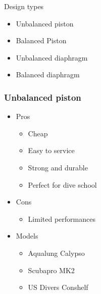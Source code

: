 \documentclass[aspectratio=1610,english,12pt]{beamer}
\begin{document}
\begin{frame}{Design types}
	\begin{itemize}
		\item Unbalanced piston
		\item Balanced Piston
		\item Unbalanced diaphragm
		\item Balanced diaphragm
	\end{itemize}
\end{frame}

\subsubsection{Unbalanced piston}
\begin{frame}{\insertsubsubsection}
\end{frame}

\begin{frame}{\insertsubsubsection}
\end{frame}

\begin{frame}{\insertsubsubsection}
	\begin{itemize}
		\item Pros
		\begin{itemize}
			\item Cheap
			\item Easy to service
			\item Strong and durable
			\item Perfect for dive school
		\end{itemize}
		\item Cons
		\begin{itemize}
			\item Limited performances
		\end{itemize}
	\end{itemize}
\end{frame}

\begin{frame}{\insertsubsubsection}
	\begin{itemize}
		\item Models
		\begin{itemize}
			\item Aqualung Calypso
			\item Scubapro MK2
			\item US Divers Conshelf
		\end{itemize}
	\end{itemize}
\end{frame}
\end{document}
